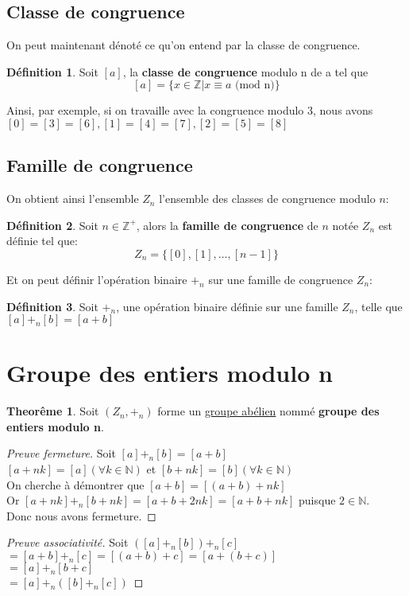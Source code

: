 \documentclass[12pt]{book}
\let\Bbb\mathbb
\def\sep{\phantom{}}
\theoremstyle{definition}
\newtheorem{definition}{Définition}[section]
\newtheorem{theorem}{Theorême}[section]
\begin{document}
\subsection{Classe de congruence}

On peut maintenant dénoté ce qu'on entend par la classe de congruence.
\begin{definition}
    \label{def:classe_congruence}
    Soit $[a]$, la \textbf{classe de congruence} modulo n de a tel que 
    $$ [a] = \{ x \in \Bbb Z | x \equiv a\text{ (mod n)} \}$$
\end{definition}

Ainsi, par exemple, si on travaille avec la congruence modulo 3, nous avons $[0] = [3] = [6], [1] = [4] = [7], [2] = [5] = [8]$

\subsection{Famille de congruence}
On obtient ainsi l'ensemble $Z_n$ l'ensemble des classes de congruence modulo $n$:
\begin{definition}
    \label{def:famille_congruence}
    Soit $n \in \Bbb Z^+$, alors la \textbf{famille de congruence} de $n$ notée $Z_n$ est définie tel que:
    $$ Z_n = \{[0], [1], \dots, [n-1]\} $$
\end{definition}

Et on peut définir l'opération binaire $+_n$ sur une famille de congruence $Z_n$:
\begin{definition}
    \label{def:addition_congruence}
    Soit $+_n$, une opération binaire définie sur une famille $Z_n$, telle que $[a] +_n [b] = [a + b]$
\end{definition}

\section{Groupe des entiers modulo n}
\begin{theorem}
    \label{thm:groupe_modulo}
    Soit $(Z_n, +_n)$ forme un \hyperref[def:groupe_abelien]{groupe abélien} nommé \textbf{groupe des entiers modulo n}.
\end{theorem}
\begin{proof}[Preuve fermeture]
    Soit $[a] +_n [b] = [a + b]$ \sep \\
    $[a + nk] = [a](\forall k \in \Bbb N)$ et $[b + nk] = [b](\forall k \in \Bbb N)$ \sep \\
    On cherche à démontrer que $[a + b] = [(a + b) + nk]$ \sep \\
    Or $[a + nk] +_n [b + nk] = [a + b + 2nk] = [a + b + nk]$ puisque $2 \in \Bbb N$. \sep \\
    Donc nous avons fermeture.
\end{proof}
\begin{proof}[Preuve associativité]
    Soit $([a] +_n [b]) +_n [c]$ \sep \\
    $= [a + b] +_n [c] = [(a + b) + c] = [a + (b + c)]$ \sep \\
    $= [a] +_n [b + c]$ \sep \\
    $= [a] +_n ([b] + _n [c])$
\end{proof}
\appendix
\end{document}
